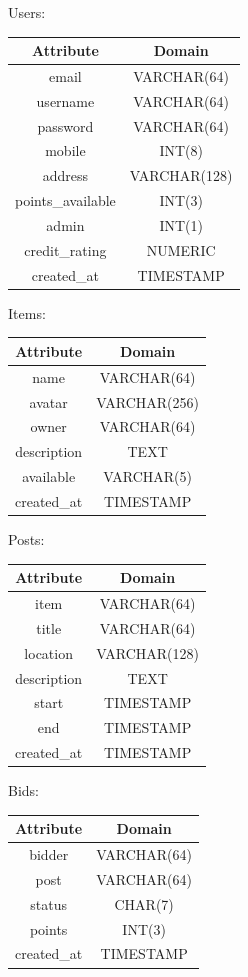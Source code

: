 \begin{center}
Users: \quad
\begin{tabular}{|c|c|}
\hline
Attribute & Domain\\
\hline
email & VARCHAR(64)\\
username & VARCHAR(64) \\
password & VARCHAR(64) \\
mobile & INT(8) \\
address & VARCHAR(128) \\
points\_available & INT(3) \\
admin & INT(1) \\
credit\_rating & NUMERIC \\
created\_at & TIMESTAMP \\
\hline
\end{tabular}
\end{center}

\begin{center}
Items: \quad
\begin{tabular}{|c|c|}
\hline
Attribute & Domain\\
\hline
name & VARCHAR(64)\\
avatar & VARCHAR(256) \\
owner & VARCHAR(64) \\
description & TEXT \\
available & VARCHAR(5)\\
created\_at & TIMESTAMP \\
\hline
\end{tabular}
\end{center}

\begin{center}
Posts: \quad
\begin{tabular}{|c|c|}
\hline
Attribute & Domain\\
\hline
item & VARCHAR(64)\\
title & VARCHAR(64) \\
location & VARCHAR(128) \\
description & TEXT \\
start & TIMESTAMP \\
end & TIMESTAMP \\
created\_at & TIMESTAMP \\
\hline
\end{tabular}
\end{center}

\begin{center}
Bids: \quad
\begin{tabular}{|c|c|}
\hline
Attribute & Domain\\
\hline
bidder & VARCHAR(64)\\
post & VARCHAR(64) \\
status & CHAR(7) \\
points & INT(3) \\
created\_at & TIMESTAMP \\
\hline
\end{tabular}
\end{center}

